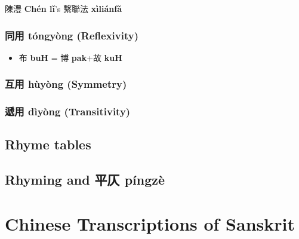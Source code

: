 \documentclass[oneside,a4paper,11pt]{article}
\newcommand{\ipa}[1]{{\phon\textbf{#1}}}
\newcommand{\zh}[1]{{\cn #1}}
\newcommand{\zhc}[2]{\zh{#1} \ipa{#2}}
\begin{document}
\zhc{陳澧}{Chén lǐ}'s \zhc{繫聯法}{xìliánfǎ}

\subsubsection{\zhc{同用}{tóngyòng} (Reflexivity)}

\begin{itemize}
\item \zhc{布}{buH} = \zhc{博}{pak}+\zhc{故}{kuH}
\end{itemize}

\subsubsection{\zhc{互用}{hùyòng} (Symmetry)}
\subsubsection{\zhc{遞用}{dìyòng} (Transitivity)}


\subsection{Rhyme tables} \label{sec:yuntu}

\subsection{Rhyming and \zhc{平仄}{píngzè}} \label{sec:pingze}

\section{Chinese Transcriptions of Sanskrit}



 
\end{document}
